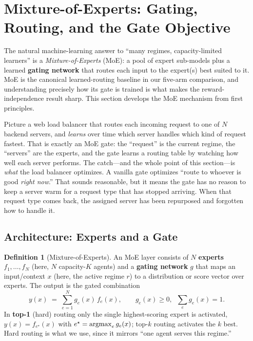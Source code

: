 \documentclass[11pt,a4paper]{article}
\theoremstyle{definition}
\newtheorem{definition}{Definition}[section]
\theoremstyle{plain}
\newcommand{\argmax}{\operatornamewithlimits{argmax}}
\begin{document}
\section{Mixture-of-Experts: Gating, Routing, and the Gate Objective}
\label{sec:moe_theory}

The natural machine-learning answer to ``many regimes, capacity-limited
learners'' is a \emph{Mixture-of-Experts} (MoE): a pool of expert sub-models plus
a learned \textbf{gating network} that routes each input to the expert(s) best
suited to it. MoE is the canonical learned-routing baseline in our five-arm
comparison, and understanding precisely how its gate is trained is what makes the
reward-independence result sharp. This section develops the MoE mechanism from
first principles.

\begin{intuition}[title={Think of the gate as a learned load balancer}]
Picture a web load balancer that routes each incoming request to one of $N$
backend servers, and \emph{learns} over time which server handles which kind of
request fastest. That is exactly an MoE gate: the ``request'' is the current
regime, the ``servers'' are the experts, and the gate learns a routing table by
watching how well each server performs. The catch---and the whole point of this
section---is \emph{what} the load balancer optimizes. A vanilla gate optimizes
``route to whoever is good \emph{right now}.'' That sounds reasonable, but it
means the gate has no reason to keep a server warm for a request type that has
stopped arriving. When that request type comes back, the assigned server has been
repurposed and forgotten how to handle it.
\end{intuition}

\subsection{Architecture: Experts and a Gate}

\begin{definition}[Mixture-of-Experts]
An MoE layer consists of $N$ \textbf{experts} $f_1, \ldots, f_N$ (here, $N$
capacity-$K$ agents) and a \textbf{gating network} $g$ that maps an input/context
$x$ (here, the active regime $r$) to a distribution or score vector over experts.
The output is the gated combination
\[
y(x) \;=\; \sum_{e=1}^{N} g_e(x)\, f_e(x),
\qquad g_e(x) \ge 0,\;\; \textstyle\sum_e g_e(x) = 1 .
\]
In \textbf{top-1} (hard) routing only the single highest-scoring expert is
activated, $y(x) = f_{e^\star}(x)$ with $e^\star = \argmax_e g_e(x)$; top-$k$
routing activates the $k$ best. Hard routing is what we use, since it mirrors
``one agent serves this regime.''
\end{definition}
\end{document}
